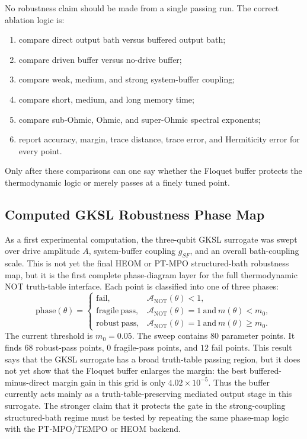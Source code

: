 \documentclass[11pt]{article}
\begin{document}
No robustness claim should be made from a single passing run.  The correct ablation logic is:
\begin{enumerate}[label=(A\arabic*)]
    \item compare direct output bath versus buffered output bath;
    \item compare driven buffer versus no-drive buffer;
    \item compare weak, medium, and strong system-buffer coupling;
    \item compare short, medium, and long memory time;
    \item compare sub-Ohmic, Ohmic, and super-Ohmic spectral exponents;
    \item report accuracy, margin, trace distance, trace error, and Hermiticity error for
    every point.
\end{enumerate}
Only after these comparisons can one say whether the Floquet buffer protects the
thermodynamic logic or merely passes at a finely tuned point.

\subsection{Computed GKSL Robustness Phase Map}

As a first experimental computation, the three-qubit GKSL surrogate was swept over
drive amplitude $A$, system-buffer coupling $g_{SF}$, and an overall bath-coupling scale.
This is not yet the final HEOM or PT-MPO structured-bath robustness map, but it is the
first complete phase-diagram layer for the full thermodynamic NOT truth-table interface.
Each point is classified into one of three phases:
\begin{equation}
    \mathrm{phase}(\theta)
    =
    \begin{cases}
    \mathrm{fail}, & \mathcal{A}_{\mathrm{NOT}}(\theta)<1,\\
    \mathrm{fragile\ pass}, & \mathcal{A}_{\mathrm{NOT}}(\theta)=1\ \mathrm{and}\ m(\theta)<m_0,\\
    \mathrm{robust\ pass}, & \mathcal{A}_{\mathrm{NOT}}(\theta)=1\ \mathrm{and}\ m(\theta)\ge m_0.
    \end{cases}
\end{equation}
The current threshold is $m_0=0.05$.  The sweep contains $80$ parameter points.  It finds
$68$ robust-pass points, $0$ fragile-pass points, and $12$ fail points.  This result says
that the GKSL surrogate has a broad truth-table passing region, but it does not yet show
that the Floquet buffer enlarges the margin: the best buffered-minus-direct margin gain in
this grid is only $4.02\times10^{-5}$.  Thus the buffer currently acts mainly as a
truth-table-preserving mediated output stage in this surrogate.  The stronger claim that it
protects the gate in the strong-coupling structured-bath regime must be tested by repeating
the same phase-map logic with the PT-MPO/TEMPO or HEOM backend.
\end{document}
